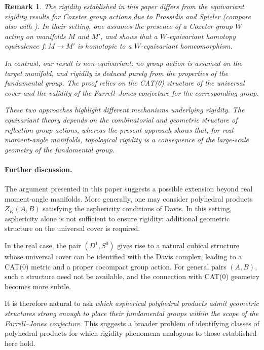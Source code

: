 \documentclass[11pt,a4paper]{article}
\numberwithin{equation}{section}
\newtheorem{remark}[definition]{Remark}
\theoremstyle{named}
\begin{document}
\begin{remark}
The rigidity established in this paper differs from the equivariant rigidity results for Coxeter group actions due to Prassidis and Spieler \cite{prasspieler} (compare also with \cite{Rosas88}). In their setting, one assumes the presence of a Coxeter group $W$ acting on manifolds $M$ and $M'$, and shows that a $W$-equivariant homotopy equivalence $f : M \to M'$ is homotopic to a $W$-equivariant homeomorphism.

In contrast, our result is non-equivariant: no group action is assumed on the target manifold, and rigidity is deduced purely from the properties of the fundamental group. The proof relies on the CAT(0) structure of the universal cover and the validity of the Farrell--Jones conjecture for the corresponding group.

These two approaches highlight different mechanisms underlying rigidity. The equivariant theory depends on the combinatorial and geometric structure of reflection group actions, whereas the present approach shows that, for real moment-angle manifolds, topological rigidity is a consequence of the large-scale geometry of the fundamental group.
\end{remark}

\paragraph*{Further discussion.}
The argument presented in this paper suggests a possible extension beyond real moment-angle manifolds. More generally, one may consider polyhedral products $Z_K(A,B)$ satisfying the asphericity conditions of Davis. In this setting, asphericity alone is not sufficient to ensure rigidity: additional geometric structure on the universal cover is required.

In the real case, the pair $(D^1,S^0)$ gives rise to a natural cubical structure whose universal cover can be identified with the Davis complex, leading to a CAT(0) metric and a proper cocompact group action. For general pairs $(A,B)$, such a structure need not be available, and the connection with CAT(0) geometry becomes more subtle.

It is therefore natural to ask \emph{which aspherical polyhedral products admit geometric structures strong enough to place their fundamental groups within the scope of the Farrell--Jones conjecture}. This suggests a broader problem of identifying classes of polyhedral products for which rigidity phenomena analogous to those established here hold.
\end{document}

